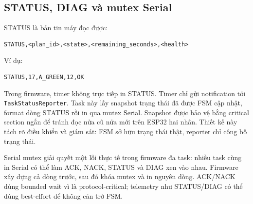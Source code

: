\subsection{STATUS, DIAG và mutex Serial}

STATUS là bản tin máy đọc được:

\begin{lstlisting}
STATUS,<plan_id>,<state>,<remaining_seconds>,<health>
\end{lstlisting}

Ví dụ:

\begin{lstlisting}
STATUS,17,A_GREEN,12,OK
\end{lstlisting}

Trong firmware, timer không trực tiếp in STATUS. Timer chỉ gửi notification tới \texttt{TaskStatusReporter}. Task này lấy snapshot trạng thái đã được FSM cập nhật, format dòng STATUS rồi in qua mutex Serial. Snapshot được bảo vệ bằng critical section ngắn để tránh đọc nửa cũ nửa mới trên ESP32 hai nhân. Thiết kế này tách rõ điều khiển và giám sát: FSM sở hữu trạng thái thật, reporter chỉ công bố trạng thái.


Serial mutex giải quyết một lỗi thực tế trong firmware đa task: nhiều task cùng in Serial có thể làm ACK, NACK, STATUS và DIAG xen vào nhau. Firmware xây dựng cả dòng trước, sau đó khóa mutex và in nguyên dòng. ACK/NACK dùng bounded wait vì là protocol-critical; telemetry như STATUS/DIAG có thể dùng best-effort để không cản trở FSM.
